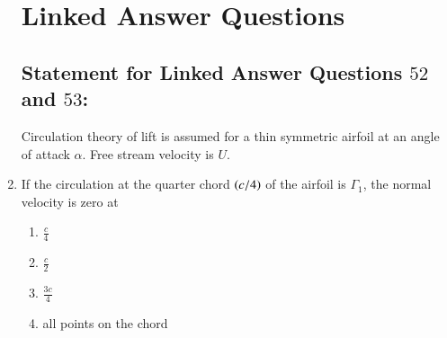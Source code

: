 \documentclass[journal,12pt,onecolumn]{IEEEtran}
\theoremstyle{remark}
\begin{document}
\begin{enumerate}[start=40]
	\section*{Linked Answer Questions}
	\subsection*{Statement for Linked Answer Questions $52$ and $53$:} Circulation theory of lift is assumed for a thin symmetric airfoil at an angle of attack $\alpha$. Free stream velocity is $U$.
\item If the circulation at the quarter chord $\left(c/4\right)$ of the airfoil is $\Gamma _1$, the normal velocity is zero at
	\begin{enumerate}
		\item $\frac{c}{4}$
		\item $\frac{c}{2}$
		\item $\frac{3c}{4}$
		\item all points on the chord
	\end{enumerate}
\end{enumerate}
\end{document}
